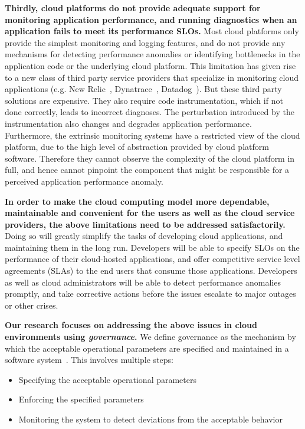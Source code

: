 \textbf{Thirdly, cloud platforms do not provide adequate support for monitoring application performance,
and running diagnostics when an application fails to meet its performance SLOs.} 
Most cloud platforms only provide the simplest monitoring and logging features,
and do not provide any mechanisms for detecting performance anomalies or identifying
bottlenecks in the application code or the underlying cloud platform. This limitation has given rise
to a new class of third party service providers that specialize in monitoring cloud applications
(e.g. New Relic~\cite{newrelic}, Dynatrace~\cite{dynatrace}, Datadog~\cite{datadog}). But these 
third party solutions are expensive. They also require code instrumentation, which
if not done correctly, leads to incorrect diagnoses. The perturbation
introduced by the instrumentation also changes and degrades application performance.
Furthermore, the extrinsic monitoring systems have a restricted view 
of the cloud platform, due to the high level of abstraction provided by cloud platform software.
Therefore they cannot observe the complexity of the cloud platform in full, and hence cannot pinpoint
the component that might be responsible for a perceived application performance anomaly.

\textbf{In order to make the cloud computing model more dependable, maintainable and convenient for the users as well
as the cloud service providers, the above limitations need to be addressed satisfactorily.}
Doing so will greatly simplify the tasks of developing cloud applications, and maintaining 
them in the long run. Developers will be able to specify SLOs on the performance of
their cloud-hosted applications, and offer competitive service level agreements (SLAs) to the end users that consume those
applications. Developers as well as cloud administrators will be able to detect performance anomalies
promptly, and take corrective actions before the issues escalate to major
outages or other crises.

\textbf{Our research focuses on addressing the above issues in cloud environments 
using \textit{governance}.} We define governance as the mechanism 
by which the acceptable operational parameters are specified and maintained in a 
software system~\cite{brown2005framing,gartner-soa-gov}. This involves multiple steps:
\begin{itemize}
\item Specifying the acceptable operational parameters
\item Enforcing the specified parameters
\item Monitoring the system to detect deviations from the acceptable behavior
\end{itemize}


